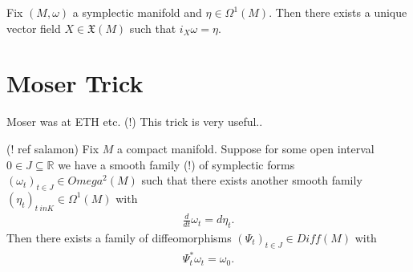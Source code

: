 \begin{proposition} \label{propisom}
Fix $(M,\omega)$ a symplectic manifold and $\eta \in \Omega^1(M)$. Then there exists a unique vector field $X \in \mathfrak{X}(M)$ such that $i_X \omega = \eta$.
\end{proposition}

\section{Moser Trick}

\begin{remark}
Moser was at ETH etc. (!)
This trick is very useful..
\end{remark}

\begin{theorem}\label{mostr}
(! ref salamon)
Fix $M$ a compact manifold. Suppose for some open interval $0 \in J \subseteq \mathbb{R}$ we have a smooth family (!) of symplectic forms $(\omega_t)_{t \in J} \in Omega^2(M)$ such that there exists another smooth family $(\eta_t)_{t \ in K} \in \Omega^1(M)$ with
\begin{align*}
\frac{d}{dt} \omega_t = d\eta_t.
\end{align*}
Then there exists a family of diffeomorphisms $(\Psi_t)_{t \in J} \in Diff(M)$ with
\begin{align*}
\Psi^*_t \omega_t = \omega_0.
\end{align*}
\end{theorem}


